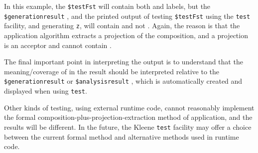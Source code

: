 \noindent
In this example, the \verb!$testFst! \fsm{} will contain both
 and  labels, but the
\verb!$generationresult! \fsm{}, and the printed output of testing
\verb!$testFst! using the \texttt{test} facility, and generating
\texttt{z}, will contain  and not .
Again, the reason is that the application algorithm extracts a projection
of the composition, and a projection is an acceptor and cannot contain
.

The final important point in interpreting the output is to understand
that the meaning/coverage of  in the result should be
interpreted relative to the \verb!$generationresult! or
\verb!$analysisresult! \fsm{}, which is automatically created and
displayed when using \texttt{test}.

Other kinds of testing, using external runtime code, cannot reasonably
implement the formal composition-plus-projection-extraction method of
application, and the results will be different.  In the future, the
Kleene \texttt{test} facility may offer a choice between the current
formal method and alternative methods used in runtime code.

